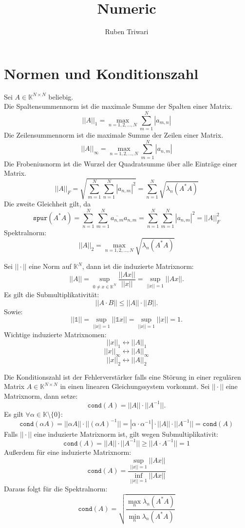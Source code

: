 \documentclass{report}
\title{\Huge{Numeric}}
\author{\huge{Ruben Triwari}}
\date{}
\begin{document}
\maketitle
\newpage%
{}
\tableofcontents
\pagebreak
\chapter{Normen und Konditionszahl}
 {
  Sei $A \in \mathbb{K}^{N\times N}$ beliebig.\\
  Die Spaltensummennorm ist die maximale Summe 
  der Spalten einer Matrix.
  \[
    ||A||_1 = \max_{n = 1,2,\dots, N} \sum_{m=1}^{N} |a_{m,n}|
  \]
  Die Zeilensummennorm ist die maximale Summe 
  der Zeilen einer Matrix.
  \[
    ||A||_{\infty} =
    \max_{n = 1,2,\dots, N} \sum_{m=1}^{N} |a_{n, m}|
  \]
  Die Frobeniusnorm ist die Wurzel der Quadratsumme über alle 
  Einträge einer Matrix.
  \[
  ||A||_F = \sqrt{\sum_{m=1}^{N}\sum_{n=1}^{N}|a_{n,m}|^2}
          = \sum_{n=1}^{N} \sqrt{\lambda_n(A^*A)}
  \]
  Die zweite Gleichheit gilt, da
  \[
    \texttt{spur}(A^*A) 
      = \sum_{n=1}^{N}\sum_{m=1}^{N} \overline{a_{n,m}} a_{n,m}
      = \sum_{n=1}^{N}\sum_{m=1}^{N} |a_{n,m}|^2
      = ||A||_F^2
  \]
  Spektralnorm:
  \[
      ||A||_2 = \max_{n = 1,2,\dots, N} \sqrt{\lambda_n(A^*A)}
  \]

}
 {
  Sei $||\cdot||$ eine Norm auf $\mathbb{K}^N$, dann ist 
  die induzierte Matrixnorm:
  \[
    ||A|| = \sup_{0 \neq x \in \mathbb{K}^N} \frac{||Ax||}{||x||}
          = \sup_{||x|| = 1} ||Ax||.
  \]
  Es gilt die Submultiplikativität:
  \[
    ||A\cdot B|| \leq ||A||\cdot ||B||.
  \]
  Sowie:
  \[
    ||\mathbb{1}|| = \sup_{||x|| = 1} ||\mathbb{1}x||
                   = \sup_{||x|| = 1} ||x|| = 1.
  \]
  Wichtige induzierte Matrixnomen:
  \[
    ||x||_1 \leftrightarrow ||A||_1 
  \]
  \[
    ||x||_\infty \leftrightarrow ||A||_\infty
  \]
  \[
    ||x||_2  \leftrightarrow 
    ||A||_2 
  \]
}

 {
  Die Konditionszahl ist der Fehlerverstärker
  falls eine Störung in
  einer regulären Matrix
  $A \in \mathbb{K}^{N\times N}$ in einen 
  linearen Gleichungssystem vorkommt.
  Sei $||\cdot||$ eine Matrixnorm, dann setze:
  \[
    \texttt{cond}(A) = ||A||\cdot ||A^{-1}||.
  \]
  Es gilt $\forall \alpha \in \mathbb{K}\setminus \{0\}$: 
  \[ 
    \texttt{cond}(\alpha A) = ||\alpha A|| \cdot ||(\alpha A)^{-1}||
    = |\alpha \cdot \alpha^{-1}| \cdot ||A|| \cdot ||A^{-1}||
    = \texttt{cond}(A) 
  \]
  Falls $||\cdot||$ eine induzierte Matrixnorm ist, gilt wegen Submultiplikativit:
  \[
    \texttt{cond}(A) = ||A||\cdot ||A^{-1}|| \ge ||A\cdot A^{-1}|| = 1
  \]
  Außerdem für eine induzierte Matrixnorm:
  \[
    \texttt{cond}(A) 
      = \frac{\sup_{||x||=1}||Ax||}{\inf_{||x||=1} ||Ax||}
  \]
  Daraus folgt für die Spektralnorm:
  \[
    \texttt{cond}(A) 
    = \sqrt{\frac{\max_{n}\lambda_n(A^*A)}{\min_{n}\lambda_n(A^*A)}}
  \]
}
\end{document}
